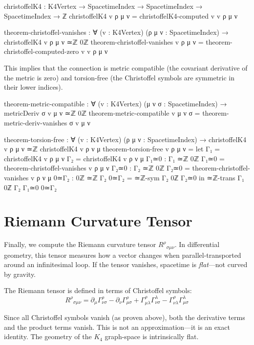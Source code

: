 \documentclass[11pt,a4paper]{book}
\begin{document}
\begin{code}
christoffelK4 : K4Vertex → SpacetimeIndex → SpacetimeIndex → SpacetimeIndex → ℤ
christoffelK4 v ρ μ ν = christoffelK4-computed v v ρ μ ν

theorem-christoffel-vanishes : ∀ (v : K4Vertex) (ρ μ ν : SpacetimeIndex) →
                                christoffelK4 v ρ μ ν ≃ℤ 0ℤ
theorem-christoffel-vanishes v ρ μ ν = theorem-christoffel-computed-zero v v ρ μ ν
\end{code}

This implies that the connection is metric compatible (the covariant derivative of the metric is zero) and torsion-free (the Christoffel symbols are symmetric in their lower indices).

\begin{code}
theorem-metric-compatible : ∀ (v : K4Vertex) (μ ν σ : SpacetimeIndex) →
  metricDeriv σ v μ ν ≃ℤ 0ℤ
theorem-metric-compatible v μ ν σ = theorem-metric-deriv-vanishes σ v μ ν

theorem-torsion-free : ∀ (v : K4Vertex) (ρ μ ν : SpacetimeIndex) →
  christoffelK4 v ρ μ ν ≃ℤ christoffelK4 v ρ ν μ
theorem-torsion-free v ρ μ ν = 
  let Γ₁ = christoffelK4 v ρ μ ν
      Γ₂ = christoffelK4 v ρ ν μ
      Γ₁≃0 : Γ₁ ≃ℤ 0ℤ
      Γ₁≃0 = theorem-christoffel-vanishes v ρ μ ν
      Γ₂≃0 : Γ₂ ≃ℤ 0ℤ
      Γ₂≃0 = theorem-christoffel-vanishes v ρ ν μ
      0≃Γ₂ : 0ℤ ≃ℤ Γ₂
      0≃Γ₂ = ≃ℤ-sym {Γ₂} {0ℤ} Γ₂≃0
  in ≃ℤ-trans {Γ₁} {0ℤ} {Γ₂} Γ₁≃0 0≃Γ₂
\end{code}

\section{Riemann Curvature Tensor}

Finally, we compute the Riemann curvature tensor $R^\rho{}_{\sigma\mu\nu}$. In differential 
geometry, this tensor measures how a vector changes when parallel-transported around an 
infinitesimal loop. If the tensor vanishes, spacetime is \emph{flat}—not curved by gravity.

The Riemann tensor is defined in terms of Christoffel symbols:
\[
R^\rho{}_{\sigma\mu\nu} = \partial_\mu \Gamma^\rho_{\nu\sigma} - \partial_\nu \Gamma^\rho_{\mu\sigma}
+ \Gamma^\rho_{\mu\lambda}\Gamma^\lambda_{\nu\sigma} - \Gamma^\rho_{\nu\lambda}\Gamma^\lambda_{\mu\sigma}
\]

Since all Christoffel symbols vanish (as proven above), both the derivative terms and the 
product terms vanish. This is not an approximation—it is an exact identity. The geometry 
of the $K_4$ graph-space is intrinsically flat.
\end{document}
